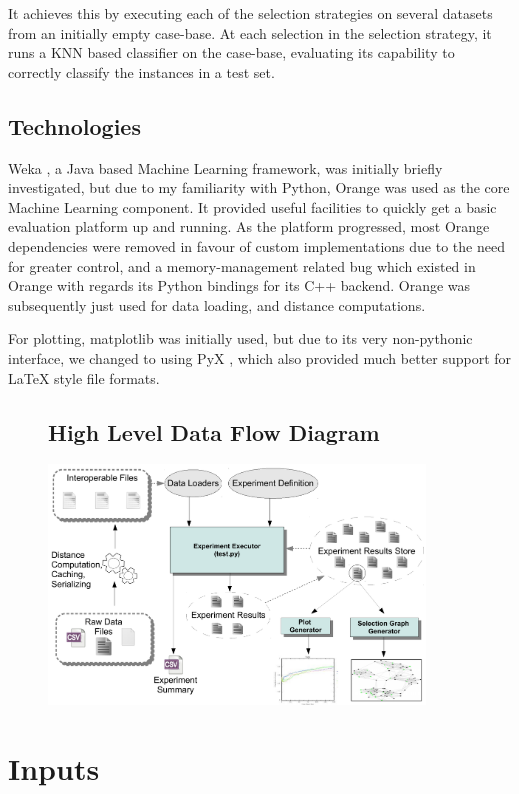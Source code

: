 \documentclass[a4paper,11pt]{report}
\begin{document}
It achieves this by executing each of the selection strategies on several datasets from an initially empty case-base. At each selection in the selection strategy, it runs a KNN based classifier on the case-base, evaluating its capability to correctly classify the instances in a test set.

\subsection{Technologies}
Weka \citep{prog:weka}, a Java based Machine Learning framework, was initially briefly investigated, but due to my familiarity with Python, Orange \citep{prog:orange} was used as the core Machine Learning component. It provided useful facilities to quickly get a basic evaluation platform up and running. As the platform progressed, most Orange dependencies were removed in favour of custom implementations due to the need for greater control, and a memory-management related bug which existed in Orange with regards its Python bindings for its C++ backend. Orange was subsequently just used for data loading, and distance computations.

For plotting, matplotlib \citep{prog:matplotlib} was initially used, but due to its very non-pythonic interface, we changed to using PyX \citep{prog:pyx}, which also provided much better support for \LaTeX{} style file formats.

\begin{figure}[h!]
\subsection{High Level Data Flow Diagram}
 \centering
\includegraphics[width=10cm]{./Drawn/DataFlowDiagram}
\end{figure}

\section{Inputs}
\end{document}
